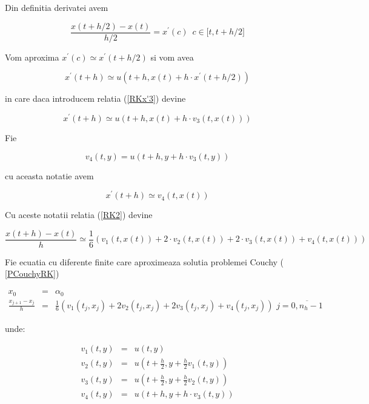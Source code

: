 \documentclass[a4paper,twoside]{book}
\begin{document}
Din definitia derivatei avem

\begin{equation*}
\frac{x(t+h/2)-x(t)}{h/2}=x^{\prime }(c)\,\,\,c\in \lbrack t,t+h/2]
\end{equation*}

Vom aproxima $x^{\prime }(c)\simeq x^{\prime }(t+h/2)$ si vom avea

\begin{equation*}
x^{\prime }(t+h)\simeq u(t+h,x(t)+h\cdot x^{\prime }(t+h/2))
\end{equation*}

in care daca introducem relatia (\ref{RKx'3}) devine

\begin{equation*}
x^{\prime }(t+h)\simeq u(t+h,x(t)+h\cdot v_{3}(t,x(t)))
\end{equation*}

Fie

\begin{equation}
v_{4}(t,y)=u(t+h,y+h\cdot v_{3}(t,y))  \label{RKv4}
\end{equation}

cu aceasta notatie avem

\begin{equation}
x^{\prime }(t+h)\simeq v_{4}(t,x(t))  \label{RKx'4}
\end{equation}

Cu aceste notatii relatia (\ref{RK2}) devine

\begin{equation*}
\frac{x(t+h)-x(t)}{h}\simeq \frac{1}{6}(v_{1}(t,x(t))+2\cdot
v_{2}(t,x(t))+2\cdot v_{3}(t,x(t))+v_{4}(t,x(t)))
\end{equation*}

Fie ecuatia cu diferente finite care aproximeaza solutia problemei Couchy (%
\ref{PCouchyRK})

\begin{eqnarray*}
x_{0} &=&\alpha _{0} \\
\frac{x_{j+1}-x_{j}}{h} &=&\frac{1}{6}%
(v_{1}(t_{j},x_{j})+2v_{2}(t_{j},x_{j})+2v_{3}(t_{j},x_{j})+v_{4}(t_{j},x_{j}))\,\,j=%
\overline{0,n_{h}-1}
\end{eqnarray*}

unde:

\begin{eqnarray*}
v_{1}(t,y) &=&u(t,y) \\
v_{2}(t,y) &=&u(t+\frac{h}{2},y+\frac{h}{2}v_{1}(t,y)) \\
v_{3}(t,y) &=&u(t+\frac{h}{2},y+\frac{h}{2}v_{2}(t,y)) \\
v_{4}(t,y) &=&u(t+h,y+h\cdot v_{3}(t,y))
\end{eqnarray*}
\end{document}
